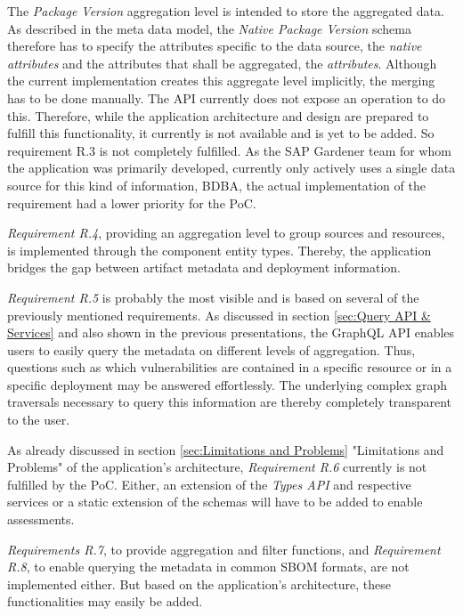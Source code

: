 The \emph{Package Version} aggregation level is intended to store the aggregated data. As described in the meta data model, the \emph{Native Package Version} schema therefore has to specify the attributes specific to the data source, the \emph{native attributes} and the attributes that shall be aggregated, the \emph{attributes}. Although the current implementation creates this aggregate level implicitly, the merging has to be done manually. The API currently does not expose an operation to do this. Therefore, while the application architecture and design are prepared to fulfill this functionality, it currently is not available and is yet to be added. So requirement R.3 is not completely fulfilled. As the SAP Gardener team for whom the application was primarily developed, currently only actively uses a single data source for this kind of information, BDBA, the actual implementation of the requirement had a lower priority for the PoC.\par
\emph{Requirement R.4}, providing an aggregation level to group sources and resources, is implemented through the component entity types. Thereby, the application bridges the gap between artifact metadata and deployment information.\par
\emph{Requirement R.5} is probably the most visible and is based on several of the previously mentioned requirements. As discussed in section \ref{sec:Query API & Services} and also shown in the previous presentations, the GraphQL API enables users to easily query the metadata on different levels of aggregation. Thus, questions such as which vulnerabilities are contained in a specific resource or in a specific deployment may be answered effortlessly. The underlying complex graph traversals necessary to query this information are thereby completely transparent to the user.\par
As already discussed in section \ref{sec:Limitations and Problems} "Limitations and Problems" of the application's architecture, \emph{Requirement R.6} currently is not fulfilled by the PoC. Either, an extension of the \emph{Types API} and respective services or a static extension of the schemas will have to be added to enable assessments.\par
\emph{Requirements R.7}, to provide aggregation and filter functions, and \emph{Requirement R.8}, to enable querying the metadata in common SBOM formats, are not implemented either. But based on the application's architecture, these functionalities may easily be added.\\

